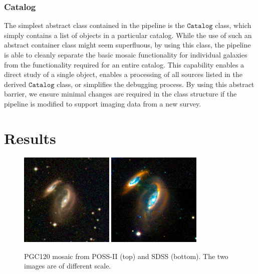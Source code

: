 \documentclass[authoryear, 12pt, 5p, times]{elsarticle}
\begin{document}
\subsubsection{Catalog}

The simplest abstract class contained in the pipeline is the $\texttt{Catalog}$ class, which simply contains a list of objects in a particular catalog. While the use of such an abstract container class might seem superfluous, by using this class, the pipeline is able to cleanly separate the basic mosaic functionality for individual galaxies from the functionality required for an entire catalog. This capability enables a direct study of a single object, enables a processing of all sources listed in the derived $\texttt{Catalog}$ class, or simplifies the debugging process. By using this abstract barrier, we ensure minimal changes are required in the class structure if the pipeline is modified to support imaging data from a new survey.

\section{Results\label{results-sec}}

\begin{figure}[h]
\centering
\includegraphics[width=0.4\textwidth]{figures/DSS_120_BEST}
\includegraphics[width=0.4\textwidth]{figures/SDSS_120_LOW}	
\caption{PGC120 mosaic from POSS-II (top) and SDSS (bottom). The two images are of different scale.}
\label{fig:comparison}
\end{figure}
\end{document}
